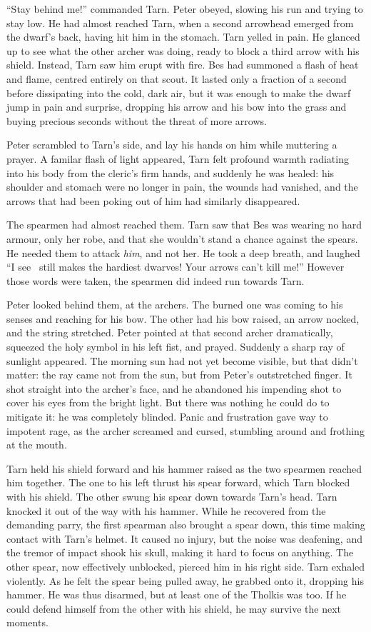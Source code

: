 ``Stay behind me!'' commanded Tarn.  Peter obeyed, slowing his run and trying to stay low.  He had almost reached Tarn, when a second arrowhead emerged from the dwarf's back, having hit him in the stomach.  Tarn yelled in pain.  He glanced up to see what the other archer was doing, ready to block a third arrow with his shield.  Instead, Tarn saw him erupt with fire.  Bes had summoned a flash of heat and flame, centred entirely on that scout.  It lasted only a fraction of a second before dissipating into the cold, dark air, but it was enough to make the dwarf jump in pain and surprise, dropping his arrow and his bow into the grass and buying precious seconds without the threat of more arrows.

Peter scrambled to Tarn's side, and lay his hands on him while muttering a prayer.  A familar flash of light appeared, Tarn felt profound warmth radiating into his body from the cleric's firm hands, and suddenly he was healed: his shoulder and stomach were no longer in pain, the wounds had vanished, and the arrows that had been poking out of him had similarly disappeared.

The spearmen had almost reached them.  Tarn saw that Bes was wearing no hard armour, only her robe, and that she wouldn't stand a chance against the spears.  He needed them to attack \emph{him}, and not her.  He took a deep breath, and laughed ``I see \korbarthrond\ still makes the hardiest dwarves!  Your arrows can't kill me!''  However those words were taken, the spearmen did indeed run towards Tarn.

Peter looked behind them, at the archers.  The burned one was coming to his senses and reaching for his bow.  The other had his bow raised, an arrow nocked, and the string stretched.  Peter pointed at that second archer dramatically, squeezed the holy symbol in his left fist, and prayed.  Suddenly a sharp ray of sunlight appeared.  The morning sun had not yet become visible, but that didn't matter: the ray came not from the sun, but from Peter's outstretched finger.  It shot straight into the archer's face, and he abandoned his impending shot to cover his eyes from the bright light.  But there was nothing he could do to mitigate it: he was completely blinded.  Panic and frustration gave way to impotent rage, as the archer screamed and cursed, stumbling around and frothing at the mouth.

Tarn held his shield forward and his hammer raised as the two spearmen reached him together.  The one to his left thrust his spear forward, which Tarn blocked with his shield.  The other swung his spear down towards Tarn's head.  Tarn knocked it out of the way with his hammer.  While he recovered from the demanding parry, the first spearman also brought a spear down, this time making contact with Tarn's helmet.  It caused no injury, but the noise was deafening, and the tremor of impact shook his skull, making it hard to focus on anything.  The other spear, now effectively unblocked, pierced him in his right side.  Tarn exhaled violently.  As he felt the spear being pulled away, he grabbed onto it, dropping his hammer.  He was thus disarmed, but at least one of the Tholkis was too.  If he could defend himself from the other with his shield, he may survive the next moments.

